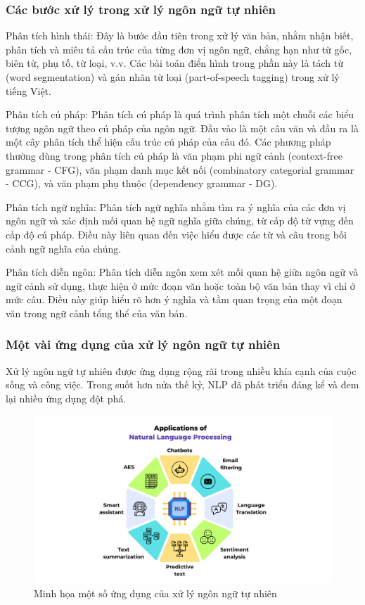\subsubsection{Các bước xử lý trong xử lý ngôn ngữ tự nhiên}

Phân tích hình thái: Đây là bước đầu tiên trong xử lý văn bản, nhằm nhận biết, phân tích và miêu tả cấu trúc của từng đơn vị ngôn ngữ, chẳng hạn như từ gốc, biên từ, phụ tố, từ loại, v.v. Các bài toán điển hình trong phần này là tách từ (word segmentation) và gán nhãn từ loại (part-of-speech tagging) trong xử lý tiếng Việt. 

Phân tích cú pháp: Phân tích cú pháp là quá trình phân tích một chuỗi các biểu tượng ngôn ngữ theo cú pháp của ngôn ngữ. Đầu vào là một câu văn và đầu ra là một cây phân tích thể hiện cấu trúc cú pháp của câu đó. Các phương pháp thường dùng trong phân tích cú pháp là văn phạm phi ngữ cảnh (context-free grammar - CFG), văn phạm danh mục kết nối (combinatory categorial grammar - CCG), và văn phạm phụ thuộc (dependency grammar - DG). 

Phân tích ngữ nghĩa: Phân tích ngữ nghĩa nhằm tìm ra ý nghĩa của các đơn vị ngôn ngữ và xác định mối quan hệ ngữ nghĩa giữa chúng, từ cấp độ từ vựng đến cấp độ cú pháp. Điều này liên quan đến việc hiểu được các từ và câu trong bối cảnh ngữ nghĩa của chúng.
 
Phân tích diễn ngôn: Phân tích diễn ngôn xem xét mối quan hệ giữa ngôn ngữ và ngữ cảnh sử dụng, thực hiện ở mức đoạn văn hoặc toàn bộ văn bản thay vì chỉ ở mức câu. Điều này giúp hiểu rõ hơn ý nghĩa và tầm quan trọng của một đoạn văn trong ngữ cảnh tổng thể của văn bản. 

\subsubsection{Một vài ứng dụng của xử lý ngôn ngữ tự nhiên}

Xử lý ngôn ngữ tự nhiên được ứng dụng rộng rãi trong nhiều khía cạnh của cuộc sống và công việc. Trong suốt hơn nửa thế kỷ, NLP đã phát triển đáng kể và đem lại nhiều ứng dụng đột phá. 

\begin{figure}[htb]
    \centering
    \includegraphics[width=\textwidth]{image/applications-of-nlp.png}
    \caption{Minh họa một số ứng dụng của xử lý ngôn ngữ tự nhiên \cite{webpage26}}
    \label{fig:applications-of-nlp}
\end{figure}

